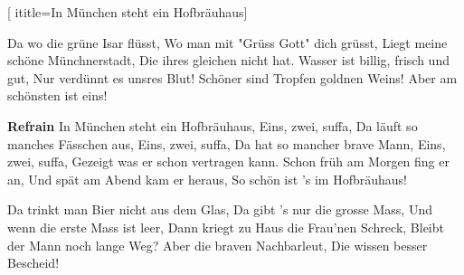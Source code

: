  [
ititle={In München steht ein Hofbräuhaus}]

\beginverse
Da wo die grüne Isar flüsst,
Wo man mit "Grüss Gott" dich grüsst,
Liegt meine schöne Münchnerstadt,
Die ihres gleichen nicht hat.
Wasser ist billig, frisch und gut,
Nur verdünnt es unsres Blut!
Schöner sind Tropfen goldnen Weins!
Aber am schönsten ist eins!
\endverse

\beginchorus
\textbf{Refrain}
In München steht ein Hofbräuhaus,
Eins, zwei, suffa,
Da läuft so manches Fässchen aus,
Eins, zwei, suffa,
Da hat so mancher brave Mann,
Eins, zwei, suffa,
Gezeigt was er schon vertragen kann.
Schon früh am Morgen fing er an,
Und spät am Abend kam er heraus,
So schön ist 's im Hofbräuhaus!
\endchorus

\beginverse
Da trinkt man Bier nicht aus dem Glas,
Da gibt 's nur die grosse Mass,
Und wenn die erste Mass ist leer,
Dann kriegt zu Haus die Frau'nen Schreck,
Bleibt der Mann noch lange Weg?
Aber die braven Nachbarleut,
Die wissen besser Bescheid!
\endverse
\endsong